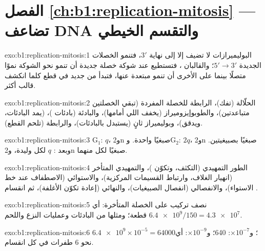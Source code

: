 \section*{الفصل \ref{ch:b1:replication-mitosis} --- تضاعف DNA والتقسم الخيطي}

\begin{solution}{exo:b1:replication-mitosis:1}
البوليميرازات لا تضيف  إلا إلى نهاية $3'$، فتنمو الخصلات
الجديدة $5' \to 3'$؛ والقالبان ، فتستطيع عند شوكة خصلة
جديدة أن تنمو نحو الشوكة نموًا متصلًا بينما على الأخرى أن تنمو مبتعدة
عنها، فتبدأ من جديد في قطع كلما انكشف قالب أكثر.
\end{solution}

\begin{solution}{exo:b1:replication-mitosis:2}
الحلّالة (تفك)،  الرابطة للخصلة المفردة (تبقي الخصلتين
متباعدتين)، والطوبوإيزوميراز (يخفف اللي أمامها)، والبادئة (بادئات
)،  (يمد البادئات، ويدقق)، وبوليميراز ثانٍ (يستبدل
بالبادئات)، والرابطة (تلحم القطع).
\end{solution}

\begin{solution}{exo:b1:replication-mitosis:3}
G$_1$: $q$، و2n صبغيًا  واحدة. وG$_2$: $2q$، و2n صبغيًا
بصبيغيتين. وبعد : $q$ لكل وليدة، و2n صبغيًا لكل منهما.
\end{solution}

\begin{solution}{exo:b1:replication-mitosis:4}
الطور التمهيدي (التكثف، وتكوّن )، والتمهيدي المتأخر (انهيار
الغلاف، وارتباط القسيمات المركزية)، والاستوائي (الاصطفاف عند خط
الاستواء)، والانفصالي (انفصال الصبيغيات)، والنهائي (إعادة تكوّن
الأغلفة)، ثم انقسام .
\end{solution}

\begin{solution}{exo:b1:replication-mitosis:5}
نصف  تركيب على الخصلة المتأخرة: أي
$\num{6.4e9}/150 =
\num{4.3e7}$ قطعة؛ ومثلها من البادئات وعمليات
النزع واللحم.
\end{solution}

\begin{solution}{exo:b1:replication-mitosis:6}
$\num{6.4e9}\times 10^{-5} = \num{64000}$؛ و$\times 10^{-7}$: 640؛
و$\times 10^{-9}$: أي نحو 6 طفرات في كل انقسام.
\end{solution}

